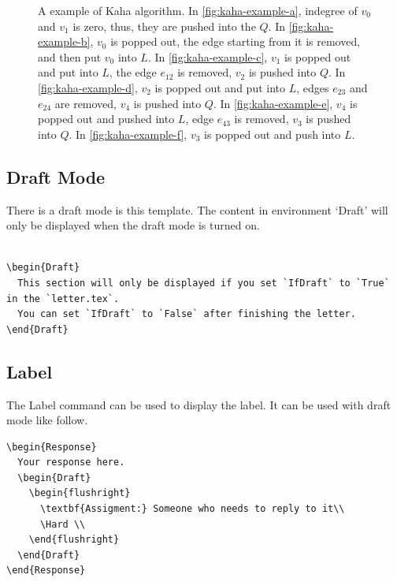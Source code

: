 \begin{figure}[H]
{  }
  \caption{
    A example of Kaha algorithm.
    In \autoref{fig:kaha-example-a}, indegree of $v_0$ and $v_1$ is zero, thus, they are pushed into the $Q$.
    In \autoref{fig:kaha-example-b}, $v_0$ is popped out, the edge starting from it is removed, and then put $v_0$ into $L$.
    In \autoref{fig:kaha-example-c}, $v_1$ is popped out and put into $L$, the edge $e_{12}$ is removed, $v_2$ is pushed into $Q$.
    In \autoref{fig:kaha-example-d}, $v_2$ is popped out and put into $L$, edges $e_{23}$ and $e_{24}$ are removed, $v_4$ is pushed into $Q$.
    In \autoref{fig:kaha-example-e}, $v_4$ is popped out and pushed into $L$, edge $e_{43}$ is removed, $v_3$ is pushed into $Q$.
    In \autoref{fig:kaha-example-f}, $v_3$ is popped out and push into $L$.
  }
  \label{fig:kaha-example} 
\end{figure}

\printbibliography[heading=none]

\subsection{Draft Mode}

There is a draft mode is this template.
The content in environment `Draft' will only be displayed when the draft mode is turned on.

\begin{verbatim}

\begin{Draft}
  This section will only be displayed if you set `IfDraft` to `True` in the `letter.tex`.
  You can set `IfDraft` to `False` after finishing the letter.
\end{Draft}

\end{verbatim}

\subsection{Label}

The Label command can be used to display the label.
It can be used with draft mode like follow.

\begin{verbatim}
\begin{Response}
  Your response here.
  \begin{Draft}
    \begin{flushright}
      \textbf{Assigment:} Someone who needs to reply to it\\
      \Hard \\
    \end{flushright}
  \end{Draft}
\end{Response}
\end{verbatim}

